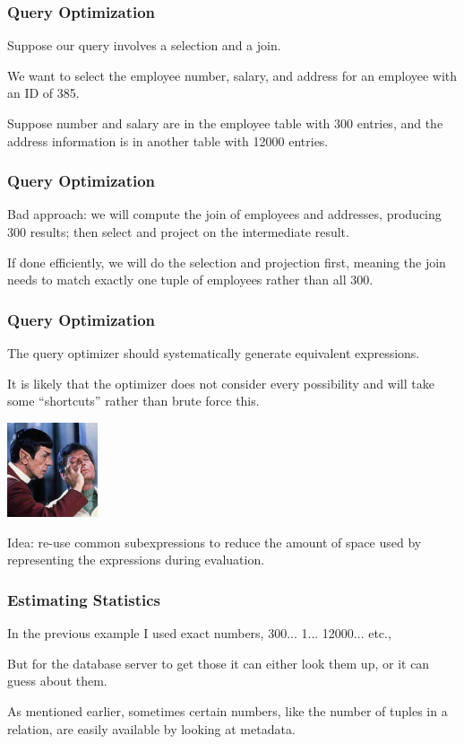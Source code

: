 \begin{frame}
\frametitle{Query Optimization}

Suppose our query involves a selection and a join. 

We want to select the employee number, salary, and address for an employee with an ID of 385. 

Suppose number and salary are in the employee table with 300 entries, and the address information is in another table with 12000 entries. 

\end{frame}

\begin{frame}
\frametitle{Query Optimization}


Bad approach: we will compute the join of employees and addresses, producing 300 results; then select and project on the intermediate result.

If done efficiently, we will do the selection and projection first, meaning the join needs to match exactly one tuple of employees rather than all 300. 

\end{frame}

\begin{frame}
\frametitle{Query Optimization}
The query optimizer should systematically generate equivalent expressions. 

It is likely that the optimizer does not consider every possibility and will take some ``shortcuts'' rather than brute force this. 


\begin{center}
	\includegraphics[width=0.2\textwidth]{images/spock-remember.jpg}
\end{center}

Idea: re-use common subexpressions to reduce the amount of space used by representing the expressions during evaluation.


\end{frame}

\begin{frame}
\frametitle{Estimating Statistics}

In the previous example I used exact numbers, 300... 1... 12000... etc.,

But for the database server to get those it can either look them up, or it can guess about them. 

As mentioned earlier, sometimes certain numbers, like the number of tuples in a relation, are easily available by looking at metadata. 

\end{frame}

